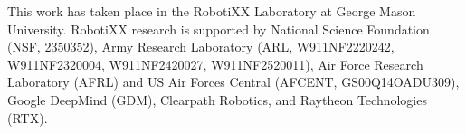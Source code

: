 This work has taken place in the RobotiXX Laboratory at George Mason University. RobotiXX research is supported by National Science Foundation (NSF, 2350352), Army Research Laboratory (ARL, W911NF2220242, W911NF2320004, W911NF2420027, W911NF2520011), Air Force Research Laboratory (AFRL) and US Air Forces Central (AFCENT, GS00Q14OADU309), Google DeepMind (GDM), Clearpath Robotics, and Raytheon Technologies (RTX).